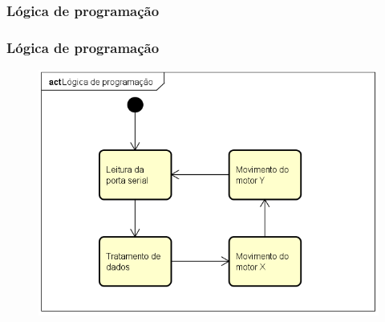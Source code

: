 \subsubsection{Lógica de programação}

\begin{frame}
\frametitle{Lógica de programação}

\begin{figure}
\centering
\includegraphics[scale = 0.45]{figuras/fluxoexecucao}
\end{figure}

\end{frame}
